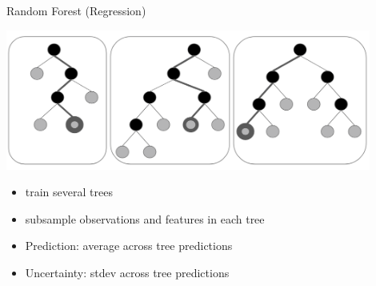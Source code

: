 \begin{frame}[c]{Random Forest (Regression)}

\includegraphics[width=0.9\textwidth]{images/random_forest_pic}

\begin{itemize}
  \item train several trees
  \item subsample observations and features in each tree
  \pause
  \item Prediction: average across tree predictions
  \pause
  \item Uncertainty: stdev across tree predictions
\end{itemize}

\end{frame}

